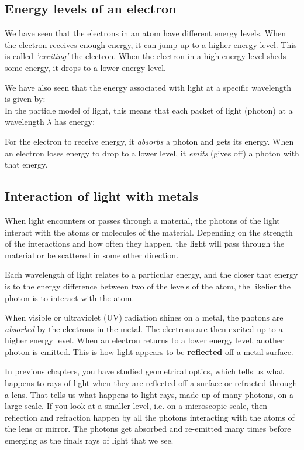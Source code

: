 \subsection{Energy levels of an electron}
We have seen that the electrons in an atom have different energy levels. When the electron receives enough energy, it can jump up to a higher energy level. This is called \textit{'exciting'} the electron. When the electron in a high energy level sheds some energy, it drops to a lower energy level. 
 
We have also seen that the energy associated with light at a specific wavelength is given by:
\\
 
In the particle model of light, this means that each packet of light (photon) at a wavelength $\lambda$ has energy:

For the electron to receive energy, it \textit{absorbs} a photon and gets its energy. When an electron loses energy to drop to a lower level, it \textit{emits} (gives off) a photon with that energy. 

\subsection{Interaction of light with metals}
When light encounters or passes through a material, the photons of the light interact with the atoms or molecules of the material.  Depending on the strength of the interactions and how often they happen, the light will pass through the material or be scattered in some other direction.
 
Each wavelength of light relates to a particular energy, and the closer that energy is to the energy difference between two of the levels of the atom, the likelier the photon is to interact with the atom.
 
When visible or ultraviolet (UV) radiation shines on a metal, the photons are \textit{absorbed} by the electrons in the metal. The electrons are then excited up to a higher energy level. When an electron returns to a lower energy level, another photon is emitted. This is how light appears to be \textbf{reflected} off a metal surface. 
 
In previous chapters, you have studied geometrical optics, which tells us what happens to rays of light when they are reflected off a surface or refracted through a lens.  That tells us what happens to light rays, made up of many photons, on a large scale.  If you look at a smaller level, i.e. on a microscopic scale, then reflection and refraction happen by all the photons interacting with the atoms of the lens or mirror.  The photons get absorbed and re-emitted many times before emerging as the finals rays of light that we see.
 
